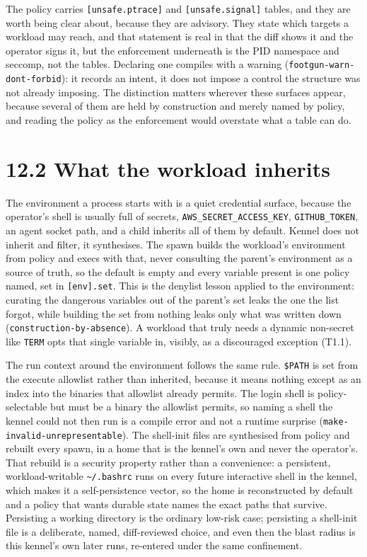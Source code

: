 The policy carries \texttt{{[}unsafe.ptrace{]}} and
\texttt{{[}unsafe.signal{]}} tables, and they are worth being clear
about, because they are advisory. They state which targets a workload
may reach, and that statement is real in that the diff shows it and the
operator signs it, but the enforcement underneath is the PID namespace
and seccomp, not the tables. Declaring one compiles with a warning
(\texttt{footgun-warn-dont-forbid}): it records an intent, it does not
impose a control the structure was not already imposing. The distinction
matters wherever these surfaces appear, because several of them are held
by construction and merely named by policy, and reading the policy as
the enforcement would overstate what a table can do.

\hypertarget{what-the-workload-inherits}{%
\section{12.2 What the workload
inherits}\label{what-the-workload-inherits}}

The environment a process starts with is a quiet credential surface,
because the operator's shell is usually full of secrets,
\texttt{AWS\_SECRET\_ACCESS\_KEY}, \texttt{GITHUB\_TOKEN}, an agent
socket path, and a child inherits all of them by default. Kennel does
not inherit and filter, it synthesises. The spawn builds the workload's
environment from policy and execs with that, never consulting the
parent's environment as a source of truth, so the default is empty and
every variable present is one policy named, set in
\texttt{{[}env{]}.set}. This is the denylist lesson applied to the
environment: curating the dangerous variables out of the parent's set
leaks the one the list forgot, while building the set from nothing leaks
only what was written down (\texttt{construction-by-absence}). A
workload that truly needs a dynamic non-secret like \texttt{TERM} opts
that single variable in, visibly, as a discouraged exception (T1.1).

The run context around the environment follows the same rule.
\texttt{\$PATH} is set from the execute allowlist rather than inherited,
because it means nothing except as an index into the binaries that
allowlist already permits. The login shell is policy-selectable but must
be a binary the allowlist permits, so naming a shell the kennel could
not then run is a compile error and not a runtime surprise
(\texttt{make-invalid-unrepresentable}). The shell-init files are
synthesised from policy and rebuilt every spawn, in a home that is the
kennel's own and never the operator's. That rebuild is a security
property rather than a convenience: a persistent, workload-writable
\texttt{\textasciitilde{}/.bashrc} runs on every future interactive
shell in the kennel, which makes it a self-persistence vector, so the
home is reconstructed by default and a policy that wants durable state
names the exact paths that survive. Persisting a working directory is
the ordinary low-risk case; persisting a shell-init file is a
deliberate, named, diff-reviewed choice, and even then the blast radius
is this kennel's own later runs, re-entered under the same confinement.


